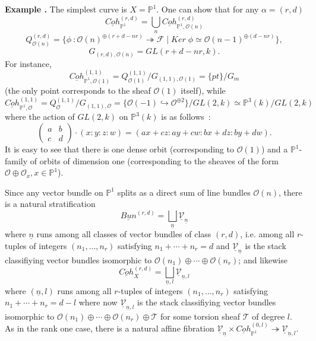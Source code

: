 \documentclass[a4paper,10pt]{amsart}
\def\tto{\twoheadrightarrow}
\def\a{\alpha}
\numberwithin{equation}{section}
\begin{document}
\addtocounter{theo}{1}
\noindent \textbf{Example \thetheo .} The simplest curve is $X=\mathbb{P}^1$. One can show that for any $\a=(r,d)$ 
$$\underline{Coh}_{\mathbb{P}^1}^{(r,d)}=\bigcup_n \underline{Coh}^{(r,d)}_{\mathbb{P}^1,\mathcal{O}(n)}$$
$$Q^{(r,d)}_{\mathcal{O}(n)}=\big\{ \phi~: \mathcal{O}(n)^{\oplus (r+d-nr)} \tto \mathcal{F}\;|\; Ker\;\phi \simeq \mathcal{O}(n-1)^{\oplus (d-nr)}\big\},$$
$$G_{(r,d),\mathcal{O}(n)}=GL(r+d-nr,k).$$
For instance, 
$$\underline{Coh}^{(1,1)}_{\mathbb{P}^1,\mathcal{O}(1)}=Q^{(1,1)}_{\mathcal{O}(1)}/G_{(1,1),\mathcal{O}(1)}=\{pt\}/G_m$$
(the only point corresponds to the sheaf $\mathcal{O}(1)$ itself), while
$$\underline{Coh}^{(1,1)}_{\mathbb{P}^1,\mathcal{O}}=Q^{(1,1)}_{\mathcal{O}}/G_{(1,1),\mathcal{O}}=\big\{ \mathcal{O}(-1) \hookrightarrow \mathcal{O}^{\oplus 2}\big\}/GL(2,k) \simeq \mathbb{P}^3(k)/GL(2,k)$$
where the action of $GL(2,k)$ on $\mathbb{P}^3(k)$ is as follows~:
$$\begin{pmatrix} a & b\\ c& d \end{pmatrix} \cdot (x:y:z:w)=(ax+cz:ay+cw:bx+dz:by+dw).$$
It is easy to see that there is one dense orbit (corresponding to $\mathcal{O}(1)$) and a $\mathbb{P}^1$-family of orbits of dimension one (corresponding to the sheaves of the form $\mathcal{O} \oplus \mathcal{O}_x, x \in \mathbb{P}^1$).

\vspace{.1in}

Since any vector bundle on $\mathbb{P}^1$ splits as a direct sum of line bundles $\mathcal{O}(n)$, there is a natural stratification
\begin{equation}\label{E:strat1}
\underline{Bun}^{(r,d)}=\bigsqcup_{\underline{n}}\underline{\mathcal{V}}_{\underline{n}}
\end{equation}
where $\underline{n}$ runs among all classes of vector bundles of class $(r,d)$, i.e. among all $r$-tuples of integers $(n_1, \ldots, n_r)$ satisfying $n_1+ \cdots + n_r=d$ and $\underline{\mathcal{V}}_{\underline{n}}$ is the stack classifiying vector bundles isomorphic to $\mathcal{O}(n_1) \oplus \cdots \oplus \mathcal{O}(n_r)$; and likewise
\begin{equation}\label{E:strat2}
\underline{Coh}^{(r,d)}_X=\bigsqcup_{\underline{n},l} \underline{\mathcal{V}}_{\underline{n},l}
\end{equation}
where $(\underline{n},l)$ runs among all $r$-tuples of integers $(n_1, \ldots, n_r)$ satisfying $n_1+ \cdots + n_r=d-l$ where now $\underline{\mathcal{V}}_{\underline{n},l}$ is the stack classifiying vector bundles isomorphic to $\mathcal{O}(n_1) \oplus \cdots \oplus \mathcal{O}(n_r) \oplus \mathcal{T}$ for some torsion sheaf $\mathcal{T}$ of degree $l$. As in the rank one case, there is a natural affine fibration 
$\underline{\mathcal{V}}_{\underline{n}} \times \underline{Coh}^{(0,l)}_{\mathbb{P}^1} \tto \underline{\mathcal{V}}_{\underline{n},l}$.
\end{document}

